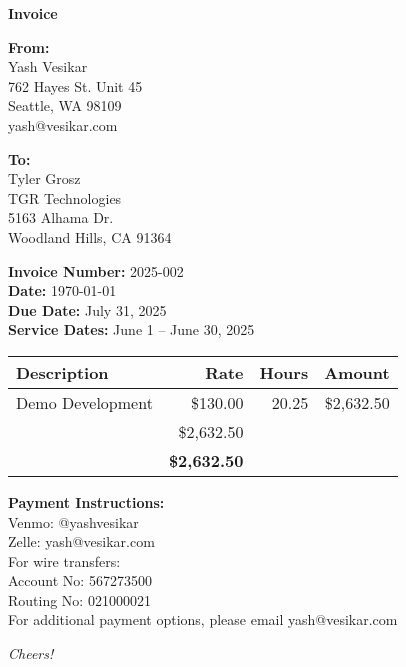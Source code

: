 \documentclass[12pt]{article}
\begin{document}
\begin{center}
    \Huge\bfseries Invoice
\end{center}

\vspace{1cm}

\textbf{From:}\\
Yash Vesikar \\
762 Hayes St. Unit 45 \\
Seattle, WA 98109 \\
yash@vesikar.com

\vspace{0.5cm}

\textbf{To:}\\
Tyler Grosz \\
TGR Technologies \\
5163 Alhama Dr. \\
Woodland Hills, CA 91364

\vspace{0.5cm}

\textbf{Invoice Number:} 2025-002 \\
\textbf{Date:} \today \\
\textbf{Due Date:} July 31, 2025 \\
\textbf{Service Dates:} June 1 – June 30, 2025

\vspace{1cm}

\begin{tabularx}{\textwidth}{|>{\raggedright\arraybackslash}X|r|r|r|}
    \hline
    \textbf{Description} & \textbf{Rate} & \textbf{Hours} & \textbf{Amount} \\
    \hline
    Demo Development & \$130.00 & 20.25 & \$2,632.50 \\
    \hline
    \multicolumn{3}{|r|}{\textbf{Subtotal}} & \$2,632.50 \\
    \hline
    \multicolumn{3}{|r|}{\textbf{Total Due}} & \textbf{\$2,632.50} \\
    \hline
\end{tabularx}

\vspace{1cm}

\textbf{Payment Instructions:} \\
Venmo: @yashvesikar \\
Zelle: \hspace{0.6em} yash@vesikar.com \\

For wire transfers: \\ 
Account No: 567273500 \\ 
Routing No: 021000021 \\

For additional payment options, please email yash@vesikar.com

\vfill

\centering
{\itshape Cheers!}
\end{document}
